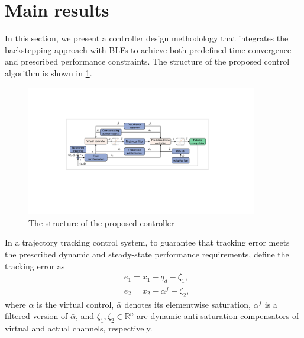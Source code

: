 \documentclass[pdflatex,sn-mathphys-num]{sn-jnl}%
\theoremstyle{thmstyleone}%
\theoremstyle{thmstyletwo}%
\theoremstyle{thmstylethree}%
\begin{document}
\section{Main results}


In this section, we present a controller design methodology that integrates the backstepping approach with BLFs to achieve both predefined-time convergence and prescribed performance constraints. The structure of the proposed control algorithm is shown in \cref{fig:2}.
\begin{figure}[H]
	\centering
	\includegraphics[width=0.9\textwidth]{fig2.pdf}
	\caption{The structure of the proposed controller}
	\label{fig:2}
\end{figure}



\par In a trajectory tracking control system, to  guarantee that tracking error meets the prescribed dynamic and steady-state performance requirements, define the tracking error as
\begin{subequations}\label{eq:20}
	\begin{align}
		&e_{1} = x_{1} - q_{d}-\zeta_{1}, \\
	  &e_{2} = x_{2} -\alpha^{f}-\zeta_{2},
	\end{align}
	\end{subequations}
	where $\alpha$ is the virtual control, $\bar{\alpha}$ denotes its elementwise saturation, $\alpha^{f}$ is a filtered version of $\bar{\alpha}$, and $\zeta_{1},\zeta_{2}\in\mathbb{R}^{n}$ are dynamic anti-saturation compensators of virtual and actual channels, respectively.
\end{document}
